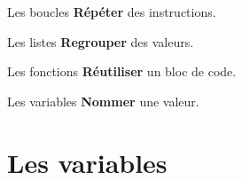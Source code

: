 \documentclass{beamer}
\newcommand{\focusframe}[5]{%
	\begin{frame}[t]{#1}
		\only<1>{}%
		\only<2>{}%
		\vfill
		\centering\small #5
	\end{frame}%
}
\begin{document}
\focusframe{Les boucles}{while,for}{%
	\ifnum\value{lstnumber}>3\ifnum\value{lstnumber}<11 \color{codekw!12}\fi\fi
	\ifnum\value{lstnumber}=14 \color{codekw!12}\fi
	\ifnum\value{lstnumber}=15 \color{codekw!12}\fi
}{focus_boucles.py}{\textbf{Répéter} des instructions.}

\focusframe{Les listes}{append,for,in}{%
	\ifnum\value{lstnumber}=3 \color{codekw!12}\fi
	\ifnum\value{lstnumber}=9 \color{codekw!12}\fi
	\ifnum\value{lstnumber}=14 \color{codekw!12}\fi
}{focus_listes.py}{\textbf{Regrouper} des valeurs.}

\focusframe{Les fonctions}{def,return,calcul_moyenne}{%
	\ifnum\value{lstnumber}>11\ifnum\value{lstnumber}<18 \color{codekw!12}\fi\fi
	\ifnum\value{lstnumber}=19 \color{codekw!12}\fi
}{focus_fonctions.py}{\textbf{Réutiliser} un bloc de code.}

\focusframe{Les variables}{nb_notes,notes_entrees,listes_notes,nouvelle_note,liste_notes,nbre_notes,somme_notes,note,moyenne}{%
	\ifnum\value{lstnumber}<4 \color{codekw!12}\fi
	\ifnum\value{lstnumber}=5 \color{codekw!12}\fi
	\ifnum\value{lstnumber}=10 \color{codekw!12}\fi
	\ifnum\value{lstnumber}=13 \color{codekw!12}\fi
	\ifnum\value{lstnumber}=15 \color{codekw!12}\fi
	\ifnum\value{lstnumber}=16 \color{codekw!12}\fi
	\ifnum\value{lstnumber}=19 \color{codekw!12}\fi
}{focus_variables.py}{\textbf{Nommer} une valeur.}


\section{Les variables}
\end{document}
